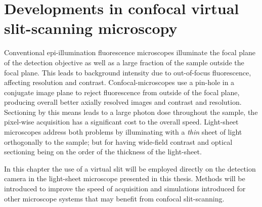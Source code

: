 \ifpdf{}
    \graphicspath{{Chapters/dualslit/Figs/Raster/}{Chapters/dualslit/Figs/PDF/}{Chapters/dualslit/Figs/}}
\else
    \graphicspath{{Chapters/dualslit/Figs/Vector/}{Chapters/dualslit/Figs/}}
\fi

\chapter{Developments in confocal virtual \gls{slit-scanning} microscopy}\label{chapter:dualslit}



Conventional epi-illumination fluorescence microscopes illuminate the focal plane of the detection objective as well as a large fraction of the sample outside the focal plane.
This leads to background intensity due to out-of-focus fluorescence, affecting resolution and contrast.
Confocal-microscopes use a pin-hole in a conjugate image plane to %
reject fluorescence from outside of the focal plane, producing overall better axially resolved images and contrast and resolution.
Sectioning by this means leads to a large photon dose throughout the sample, the pixel-wise acquisition has a significant cost to the overall speed.
Light-sheet microscopes address both problems by illuminating with a \emph{thin} sheet of light orthogonally to the sample; but for having wide-field contrast and optical sectioning being on the order of the thickness of the light-sheet.

In this chapter the use of a virtual slit will be employed directly on the detection camera in the \gls{light-sheet} microscope presented in this thesis.
Methods will be introduced to improve the speed of acquisition and simulations introduced for other microscope systems that may benefit from confocal \gls{slit-scanning}.

